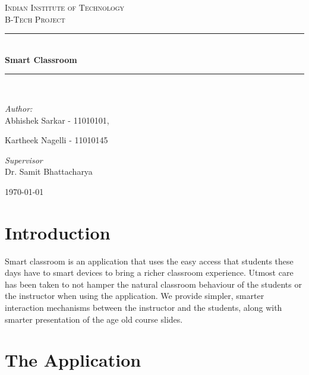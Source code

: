 \documentclass[a4paper,12pt]{article}
\newcommand{\HRule}{\rule{\linewidth}{0.5mm}}
\begin{document}
\begin{titlepage}
	\begin{center}
		
		\textsc{\LARGE Indian Institute of Technology}\\ [1.5cm]
		
		\textsc{\LARGE B-Tech Project}\\ [0.5cm]
		
		
		\HRule \\[0.4cm]
		{ \huge \bfseries Smart Classroom \\[0.4cm] }
		
		
		\HRule \\[1.5cm]
		
		 \noindent
		 \begin{minipage}{0.4\textwidth}
		 \begin{flushleft}
		 	\emph{Author:}\\
		 	Abhishek Sarkar - 11010101,
		 	
		 	
		 	Kartheek Nagelli - 11010145
		 \end{flushleft}
		 
		 
		\end{minipage}		
		\begin{minipage}{0.4\textwidth}
		\begin{flushright}
			\emph{Supervisor}\\
			Dr. Samit Bhattacharya
		\end{flushright}
		
		\end{minipage}
 		
 		
 		\vfill
 		
 		
 		{\large \today}
		
	\end{center}
\end{titlepage}


\section*{Introduction}
	Smart classroom is an application that uses the easy access that students these days have to smart devices to bring a richer classroom experience. Utmost care has been taken to not hamper the natural classroom behaviour of the students or the instructor when using the application. We provide simpler, smarter interaction mechanisms between the instructor and the students, along with smarter presentation of the age old course slides.
	
\section*{The Application}
	


	
\end{document}
